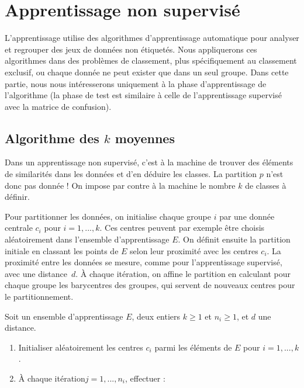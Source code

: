 \documentclass[12pt,fancy]{cours}
\begin{document}
\section{Apprentissage non supervisé}

L'apprentissage  utilise des
algorithmes d'apprentissage automatique pour analyser et regrouper des jeux de données
non étiquetés. Nous appliquerons ces algorithmes dans des problèmes de classement, plus spécifiquement au classement exclusif, ou chaque donnée ne peut exister que dans un seul groupe.  Dans cette partie, nous nous intéresserons uniquement à la phase d'apprentissage de l'algorithme (la phase de test est similaire à celle de l'apprentissage supervisé avec la matrice de confusion).

\subsection{Algorithme des $k$ moyennes}

 Dans un apprentissage non supervisé, c’est à la machine de trouver des éléments de similarités dans les données et d’en déduire les classes. La partition $p$ n’est donc pas donnée ! On impose par contre à la machine le nombre $k$ de classes à définir.

Pour partitionner les données, on initialise chaque groupe $i$ par une donnée centrale $c_{i}$ pour $i=1,...,k$. Ces centres peuvent par exemple être choisis aléatoirement dans l’ensemble d’apprentissage $E$. On définit ensuite la partition initiale en classant les points de $E$ selon leur proximité avec les centres $c_{i}$. La proximité entre les données se mesure, comme pour l’apprentissage supervisé, avec une distance~$d$.
À chaque itération, on affine le partition en calculant pour chaque groupe les barycentres des groupes, qui servent de nouveaux centres pour le partitionnement.


\begin{definition}
    Soit un ensemble d'apprentissage $E$, deux entiers $k\geq1$ et $n_i\geq 1$, et $d$ une distance.
\begin{enumerate}
\item Initialiser aléatoirement les centres $c_{i}$ parmi les éléments de $E$ pour $i=1,...,k$.
\item À chaque itération$j=1,...,n_i$, effectuer :
\end{enumerate}
\end{definition}
\end{document}

